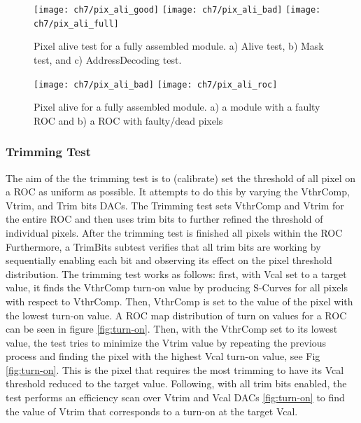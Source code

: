 \begin{figure}[!h]
  \centering
   \texttt{[image: ch7/pix\_ali\_good]}
   \texttt{[image: ch7/pix\_ali\_bad]}
   \texttt{[image: ch7/pix\_ali\_full]}
  \caption[Pixel alive test]{Pixel alive test for a fully assembled module. a) Alive test, b) Mask test, and c) AddressDecoding test.{}}\label{fig:pix_ali}
\end{figure}

\begin{figure}[!h]
  \centering
   \texttt{[image: ch7/pix\_ali\_bad]}
   \texttt{[image: ch7/pix\_ali\_roc]}
  \caption[Faulty pixel alive test]{Pixel alive for a fully assembled module. a) a module with a faulty ROC and b) a ROC with faulty/dead pixels}\label{fig:pix_ali_bad}
\end{figure}

\subsubsection{Trimming Test}
The aim of the the trimming test is to (calibrate) set the threshold of all pixel on a ROC as uniform as possible. It attempts to do this by varying the VthrComp, Vtrim, and Trim bits DACs. The Trimming test sets VthrComp and Vtrim for the entire ROC and then uses trim bits to further refined the threshold of individual pixels. After the trimming test is finished all pixels within the ROC {}  Furthermore, a TrimBits subtest verifies that all trim bits are working by sequentially enabling each bit and observing its effect on the pixel threshold distribution. The trimming test works as follows: first, with Vcal set to a target value, it finds the VthrComp turn-on value by producing S-Curves for all pixels with respect to VthrComp. Then, VthrComp is set to the value of the pixel with the lowest turn-on value. A ROC map distribution of turn on values for a ROC can be seen in figure \ref{fig:turn-on}. Then, with the VthrComp set to its lowest value, the test tries to minimize the Vtrim value by repeating the previous process and finding the pixel with the highest Vcal turn-on value, see Fig \ref{fig:turn-on}. This is the pixel that requires the most trimming to have its Vcal threshold reduced to the target value. Following, with all trim bits enabled, the test performs an efficiency scan over Vtrim and Vcal DACs \ref{fig:turn-on} to find the value of Vtrim that corresponds to a turn-on at the target Vcal.

